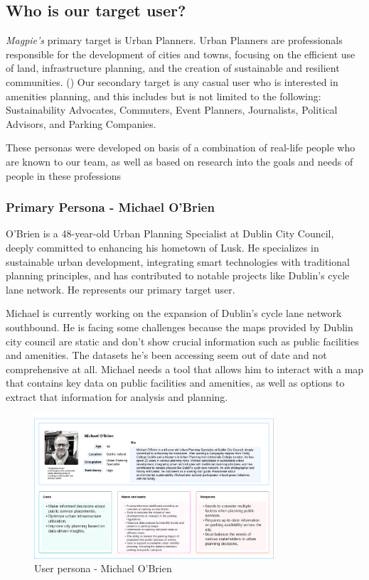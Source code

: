 \documentclass[preview]{standalone}
\begin{document}
\subsection{Who is our target user?}
\textit{Magpie's} primary target is Urban Planners. Urban Planners are
professionals responsible for the development of cities and towns, focusing on
the efficient use of land, infrastructure planning, and the creation of
sustainable and resilient communities. (\cite{fischler2012fifty}) Our secondary
target is any casual user who is interested in amenities planning, and this
includes but is not limited to the following: Sustainability Advocates,
Commuters, Event Planners, Journalists, Political Advisors, and Parking
Companies.

These personas were developed on basis of a combination of real-life people who
are known to our team, as well as based on research into the goals and needs of
people in these professions

\subsubsection{Primary Persona - Michael O'Brien}
O'Brien is a 48-year-old Urban Planning Specialist at Dublin City Council,
deeply committed to enhancing his hometown of Lusk. He specializes in
sustainable urban development, integrating smart technologies with traditional
planning principles, and has contributed to notable projects like Dublin's cycle
lane network. He represents our primary target user.

Michael is currently working on the expansion of Dublin's cycle lane network
southbound. He is facing some challenges because the maps provided by Dublin
city council are static and don't show crucial information such as public
facilities and amenities. The datasets he's been accessing seem out of date and
not comprehensive at all. Michael needs a tool that allows him to interact with
a map that contains key data on public facilities and amenities, as well as
options to extract that information for analysis and planning.

\begin{figure}[htbp]
    \centering{}{}
    \includegraphics[width=0.8\textwidth]{images/michael-obrien-userpersona.png}
    \caption{User persona - Michael O'Brien}
\end{figure}
\end{document}
